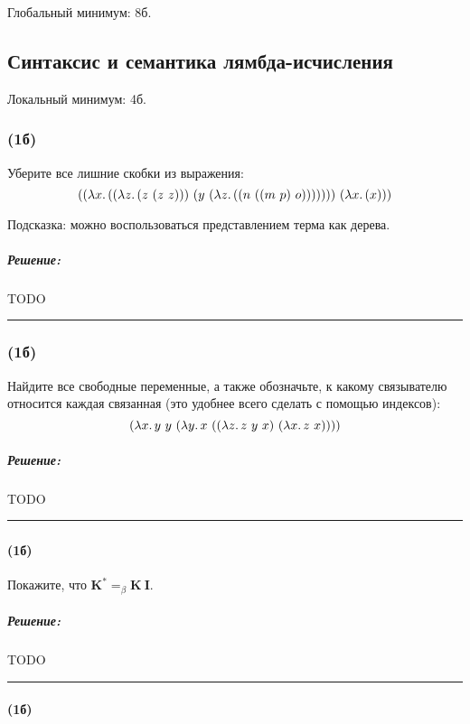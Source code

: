 \documentclass{article}
\newenvironment{proof}{\subparagraph{\hspace{-1em}Решение:\newline}}{\par\noindent\rule{\textwidth}{0.4pt}}
\newcommand{\comb}[1]{\mathbf{#1}}
\newcommand{\eqbeta}{=_\beta}
\begin{document}
    Глобальный минимум: 8б.

    \subsection{Синтаксис и семантика лямбда-исчисления}

    Локальный минимум: 4б.

    \subsubsection{(1б)}

    Уберите все лишние скобки из выражения:
    \[((\lambda x\ldotp ((\lambda z\ldotp (z~(z~z)))~(y~(\lambda z\ldotp ((n~((m~p)~o)))))))~(\lambda x\ldotp (x)))\]

    Подсказка: можно воспользоваться представлением терма как дерева.

    \begin{proof}
        TODO %
    \end{proof}

    \subsubsection{(1б)}

    Найдите все свободные переменные, а также обозначьте, к какому связывателю относится каждая связанная (это удобнее всего сделать с помощью индексов):
    \[(\lambda x\ldotp y~y~(\lambda y\ldotp x~((\lambda z\ldotp z~y~x)~(\lambda x\ldotp z~x))))\]

    \begin{proof}
        TODO %
    \end{proof}

    \subsubsection{}

    \paragraph{(1б)}

    Покажите, что $\comb{K}^* \eqbeta \comb{K}~\comb{I}$.

    \begin{proof}
        TODO %
    \end{proof}

    \paragraph{(1б)}
\end{document}
